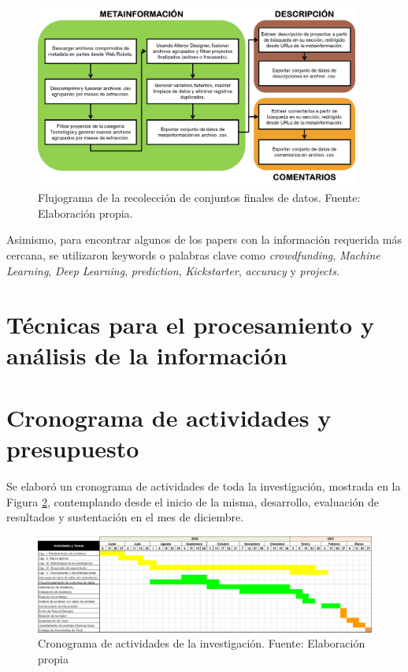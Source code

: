 \begin{figure}[h]
	\begin{center}
		\includegraphics[width=0.95\textwidth]{3/figures/data_recolection_flux.png}
		\caption{Flujograma de la recolección de conjuntos finales de datos. Fuente: Elaboración propia.}
		\label{3:fig4}
	\end{center}
\end{figure}

Asimismo, para encontrar algunos de los papers con la información requerida más cercana, se utilizaron keywords o palabras clave como \textit{crowdfunding}, \textit{Machine Learning}, \textit{Deep Learning}, \textit{prediction}, \textit{Kickstarter}, \textit{accuracy} y \textit{projects}.

\section{Técnicas para el procesamiento y análisis de la información}



\section{Cronograma de actividades y presupuesto}
Se elaboró un cronograma de actividades de toda la investigación, mostrada en la Figura \ref{3:fig5}, contemplando desde el inicio de la misma, desarrollo, evaluación de resultados y sustentación en el mes de diciembre.
\begin{figure}[h]
	\begin{center}
		\includegraphics[width=1.1\textwidth]{3/figures/cronograma.png}
		\caption{Cronograma de actividades de la investigación. Fuente: Elaboración propia}
		\label{3:fig5}
	\end{center}
\end{figure}